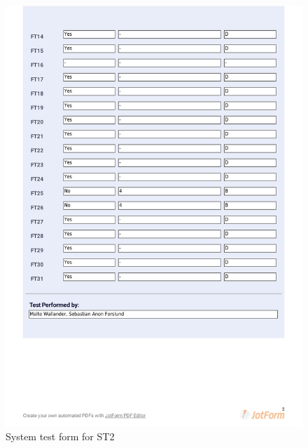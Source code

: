 \documentclass{article}
\begin{document}
 \begin{figure}
     \centering
     \includegraphics[width=13cm]{images/2021-03-04_Malte_ST2-2}
     \renewcommand\figurename{Figure}
     \caption{System test form for ST2}
     \label{fig:my_label}
 \end{figure}
 
\end{document}
